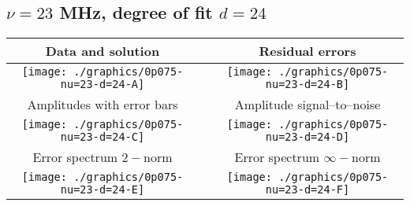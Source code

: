

% 

\clearpage{}
\break{}

\subsection{$\nu = 23$ MHz, degree of fit $d = 24$}

\begin{table}[h]
    \begin{center}
        \begin{tabular}{ccc}
            Data and solution & \quad & Residual errors \\\hline
            \texttt{[image: ./graphics/0p075-nu=23-d=24-A]} &&
            \texttt{[image: ./graphics/0p075-nu=23-d=24-B]} \\[15pt]
            Amplitudes with error bars && Amplitude signal--to--noise \\\hline
            \texttt{[image: ./graphics/0p075-nu=23-d=24-C]} &&
            \texttt{[image: ./graphics/0p075-nu=23-d=24-D]} \\[15pt]
            Error spectrum $2-$norm && Error spectrum $\infty-$norm \\\hline
            \texttt{[image: ./graphics/0p075-nu=23-d=24-E]} &&
            \texttt{[image: ./graphics/0p075-nu=23-d=24-F]} \\[15pt]
        \end{tabular}
    \end{center}
\label{fig:elev=75, nu=23}
\end{table}



\endinput
